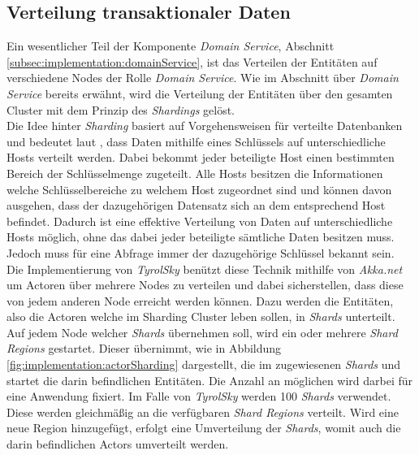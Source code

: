 \subsection{Verteilung transaktionaler Daten}
\label{subsec:implementation:akkaSharding}
Ein wesentlicher Teil der Komponente \textit{Domain Service}, Abschnitt \ref{subsec:implementation:domainService}, ist das Verteilen der Entitäten auf verschiedene Nodes der Rolle \textit{Domain Service}. Wie im Abschnitt über \textit{Domain Service} bereits erwähnt, wird die Verteilung der Entitäten über den gesamten Cluster mit dem Prinzip des \textit{Shardings} gelöst. \\
Die Idee hinter \textit{Sharding} basiert auf Vorgehensweisen für verteilte Datenbanken und bedeutet laut \cite{shardingCattell}, dass Daten mithilfe eines Schlüssels auf unterschiedliche Hosts verteilt werden. Dabei bekommt jeder beteiligte Host einen bestimmten Bereich der Schlüsselmenge zugeteilt. Alle Hosts besitzen die Informationen welche Schlüsselbereiche zu welchem Host zugeordnet sind und können davon ausgehen, dass der dazugehörigen Datensatz sich an dem entsprechend Host befindet. Dadurch ist eine effektive Verteilung von Daten auf unterschiedliche Hosts möglich, ohne das dabei jeder beteiligte sämtliche Daten besitzen muss. Jedoch muss für eine Abfrage immer der dazugehörige Schlüssel bekannt sein. \\
Die Implementierung von \textit{TyrolSky} benützt diese Technik mithilfe von \textit{Akka.net} um Actoren über mehrere Nodes zu verteilen und dabei sicherstellen, dass diese von jedem anderen Node erreicht werden können. Dazu werden die Entitäten, also die Actoren welche im Sharding Cluster leben sollen, in \textit{Shards} unterteilt. Auf jedem Node welcher \textit{Shards} übernehmen soll, wird ein oder mehrere  \textit{Shard Regions} gestartet. Dieser übernimmt, wie in Abbildung \ref{fig:implementation:actorSharding} dargestellt, die im zugewiesenen \textit{Shards} und startet die darin befindlichen Entitäten. Die Anzahl an möglichen  wird darbei für eine Anwendung fixiert. Im Falle von \textit{TyrolSky} werden {100} \textit{Shards} verwendet. Diese werden gleichmäßig an die verfügbaren \textit{Shard Regions} verteilt. Wird eine neue Region hinzugefügt, erfolgt eine Umverteilung der \textit{Shards}, womit auch die darin befindlichen Actors umverteilt werden. 

